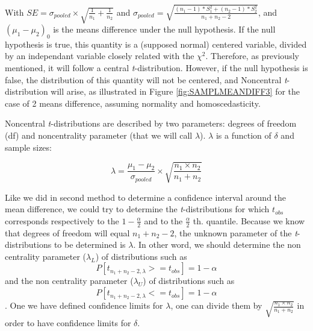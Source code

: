 \documentclass[man,floatsintext]{apa6}
\begin{document}
With \(SE = \sigma_{pooled} \times \sqrt{\frac{1}{n_1}+\frac{1}{n_2}}\) and \(\sigma_{pooled} = \sqrt{\frac{(n_1-1)*S^2_1+(n_2-1)*S^2_2}{n_1+n_2-2}}\), and \((\mu_1-\mu_2)_0\) is the means difference under the null hypothesis. If the null hypothesis is true, this quantity is a (supposed normal) centered variable, divided by an independant variable closely related with the \(\chi^2\). Therefore, as previously mentioned, it will follow a central \emph{t}-distribution. However, if the null hypothesis is false, the distribution of this quantity will not be centered, and Noncentral \emph{t}-distribution will arise, as illustrated in Figure \ref{fig:SAMPLMEANDIFF3} for the case of 2 means difference, assuming normality and homoscedasticity.

Noncentral \emph{t}-distributions are described by two parameters: degrees of freedom (df) and noncentrality parameter (that we will call \(\lambda\)). \(\lambda\) is a function of \(\delta\) and sample sizes:

\begin{equation}
\lambda = \frac{\mu_1-\mu_2}{\sigma_{pooled}} \times \sqrt{\frac{n_1 \times n_2}{n_1 + n_2}}
\label{eq:ncp}
\end{equation}

Like we did in second method to determine a confidence interval around the mean difference, we could try to determine the \emph{t}-distributions for which \(t_{obs}\) corresponds respectively to the \(1-\frac{\alpha}{2}\) and to the \(\frac{\alpha}{2}\) th. quantile. Because we know that degrees of freedom will equal \(n_1+n_2-2\), the unknown parameter of the \emph{t}-distributions to be determined is \(\lambda\). In other word, we should determine the non centrality parameter (\(\lambda_L\)) of distributions such as \[P[t_{n_1+n_2-2, \lambda} >= t_{obs}] = 1- \alpha \] and the non centrality parameter (\(\lambda_U\)) of distributions such as \[P[t_{n_1+n_2-2, \lambda} <= t_{obs}] = 1- \alpha \]. One we have defined confidence limits for \(\lambda\), one can divide them by \(\sqrt{\frac{n_1 \times n_2}{n_1 + n_2}}\) in order to have confidence limits for \(\delta\).
\end{document}

